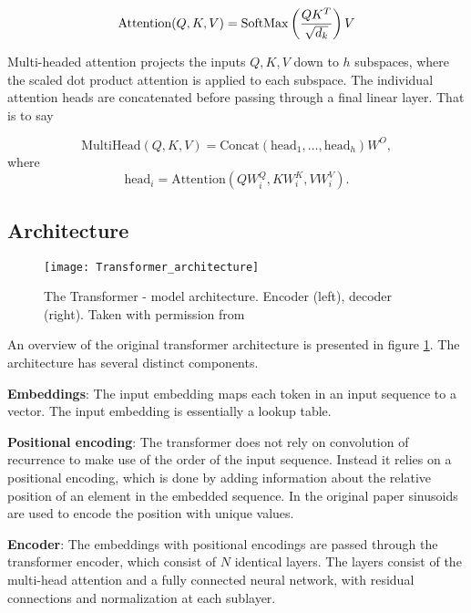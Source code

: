 \documentclass[../../thesis.tex]{subfiles}
\begin{document}
\begin{equation}
    \text{Attention}(Q,K,V) = \operatorname{SoftMax} \left(\frac{QK^T}{\sqrt{d_k}}\right)V
\end{equation}

Multi-headed attention projects the inputs $Q,K,V$ down to $h$ subspaces, where the scaled dot product attention is applied to each subspace. The individual attention heads are concatenated before passing through a final linear layer. That is to say 

\begin{equation}
    \text{MultiHead}(Q,K,V) = \text{Concat}(\text{head}_1,\dots, \text{head}_h)W^O,
\end{equation}
where
\begin{equation}
    \text{head}_i = \text{Attention}(QW_i^Q,KW_i^K,VW_i^V). 
\end{equation}


\subsection{Architecture}


\begin{figure}[h]
    \texttt{[image: Transformer\_architecture]}
    \centering 
    \label{fig:transformer}
    \caption{The Transformer - model architecture. Encoder (left), decoder (right). Taken with permission from \cite{vaswani2023attention}}
\end{figure}
An overview of the original transformer architecture is presented in figure \ref{fig:transformer}. The architecture has several distinct components.
\newline

\textbf{Embeddings}: The input embedding maps each token in an input sequence to a vector. The input embedding is essentially a lookup table. 
\newline

\textbf{Positional encoding}: The transformer does not rely on convolution of recurrence to make use of the order of the input sequence. Instead it relies on a positional encoding, which is done by adding information about the relative position of an element in the embedded sequence. In the original paper \cite{vaswani2023attention} sinusoids are used to encode the position with unique values. 
\newline

\textbf{Encoder}: The embeddings with positional encodings are passed through the transformer encoder, which consist of $N$ identical layers. The layers consist of the multi-head attention and a fully connected neural network, with residual connections and normalization at each sublayer. 
\newline
\end{document}
